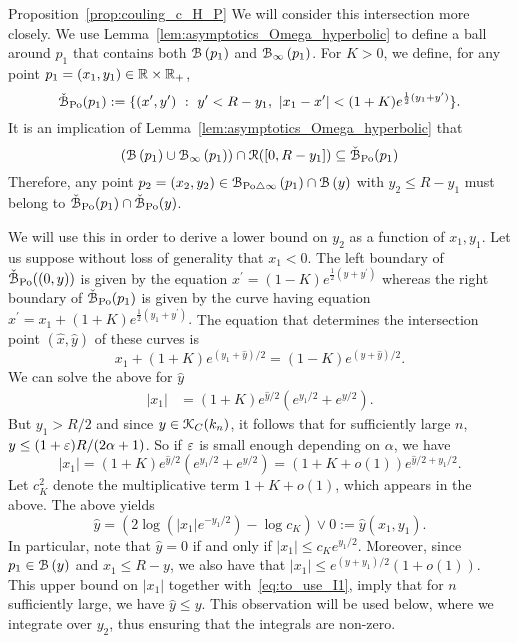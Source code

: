 \begin{proofof}{Proposition~\ref{prop:couling_c_H_P}}
We will consider this intersection more closely. We use Lemma~\ref{lem:asymptotics_Omega_hyperbolic} to define a ball around $p_1$ that contains both 
${\mathcal B}\left(p_1\right)$ and ${\mathcal B}_{\infty}\left(p_1\right)$.
For $K > 0$, we define, for any point $p_1=(x_1,y_1) \in {\ensuremath{\mathbb R}} \times {\ensuremath{\mathbb R}}_+$,
\begin{equation}\label{eq:def_fatball}
	\check{{\mathcal B}}_{{\mathrm{Po}}}(p_1) : = \{ (x',y') \ : \  y' < R - y_1, \ | x_1 - x'| < (1+K) e^{\frac{1}{2} (y_1 + y')}  \}.
\end{equation}
It is an implication of Lemma~\ref{lem:asymptotics_Omega_hyperbolic}  that 
\begin{equation*} %
(\BallHyp{p_1} \cup \BallPo{p_1}) \cap \Rcal([0, R - y_1]) \subseteq \FatBallHyp{p_1}
\end{equation*}
Therefore, any point $p_2 = (x_2,y_2) \in {\mathcal B}_{{\mathrm{Po}} \bigtriangleup \infty}\left(p_1\right) \cap {\mathcal B}\left(y\right)$ with 
$y_2 \leq R-y_1$ must belong to $\check{{\mathcal B}}_{{\mathrm{Po}}}(p_1) \cap \check{{\mathcal B}}_{{\mathrm{Po}}}(y)$.

We will use this in order to derive a lower bound on $y_2$ as a function of $x_1, y_1$. 
Let us suppose without loss of generality that $x_1 < 0$. 
The left boundary of $\check{{\mathcal B}}_{{\mathrm{Po}}}((0,y))$ is given by the equation 
$x^\prime = (1-K)e^{\frac{1}{2} (y + y^\prime)}$ whereas the right boundary of $\check{{\mathcal B}}_{{\mathrm{Po}}}(p_1)$ is given by the curve having equation $x^\prime = x_1 + (1+ K)e^{\frac{1}{2} (y_1 + y^\prime)}.$
The equation that determines the intersection point $(\hat{x},\hat{y})$ of these curves  is
\[
	x_1 + (1+K)e^{(y_1 + \hat{y})/2}= (1-K) e^{(y + \hat{y})/2}.
\]
We can solve the above for $\hat{y}$  
\begin{equation*} 
\begin{split}
|x_1| &=(1+K) e^{\hat{y}/2} \left( e^{y_1/2} + e^{y/2} \right).
\end{split}
\end{equation*}
But $y_1 > R/2$ and since $y \in {\mathcal K}_{C}(k_n)$, it follows that for sufficiently large $n$, $y \le (1+\varepsilon) R /(2\alpha +1)$. So if $\varepsilon$ is small enough depending on $\alpha$, we have 
$$ |x_1| =(1+K) e^{\hat{y}/2} \left( e^{y_1/2} + e^{y/2} \right) = (1+K+o(1))e^{\hat{y}/2 + y_1/2}. $$
Let $c_K^2$ denote the multiplicative term $1+ K+o(1)$, which appears in the above.
The above yields
\begin{equation} \label{eq:to_use_I1}
\hat{y}= \left(2 \log(|x_1|e^{-y_1/2}) - \log c_K \right) \vee 0 := \hat{y}(x_1,y_1). 
\end{equation}
In particular, note that $\hat{y} = 0$ if and only if $|x_1| \leq c_K e^{y_1/2}$.  
Moreover, since $p_1 \in {\mathcal B}\left(y\right)$ and $x_1 \leq R - y$, we also have that 
$|x_1| \leq e^{(y+y_1)/2} (1+o(1))$. This upper bound on $|x_1|$ together with~\eqref{eq:to_use_I1}, imply that for $n$ sufficiently large, we have $\hat{y} \leq y$. This observation will be used below, where 
we integrate over $y_2$, thus ensuring that the integrals are non-zero. 


\end{proofof}
